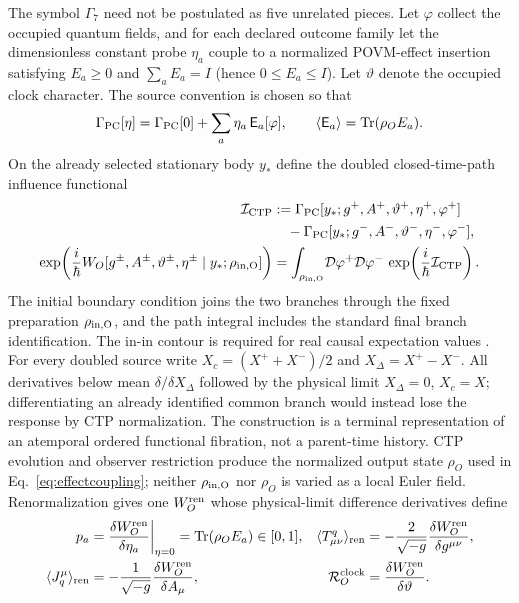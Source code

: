 The symbol $\Gamma_7$ need not be postulated as five unrelated pieces.  Let
$\varphi$ collect the occupied quantum fields, and for each declared outcome
family let the dimensionless constant probe $\eta_a$ couple to a normalized
POVM-effect insertion satisfying
$E_a\geq0$ and $\sum_aE_a=I$ (hence $0\leq E_a\leq I$).  Let $\vartheta$
denote the occupied clock character.  The source convention is chosen so that
\begin{equation}
\Gamma_{\rm PC}[\eta]
=\Gamma_{\rm PC}[0]+\sum_a\eta_a\,\mathsf E_a[\varphi],
\qquad
\langle\mathsf E_a\rangle=\operatorname{Tr}(\rho_OE_a).
\label{eq:effectcoupling}
\end{equation}
On the already selected stationary body $y_*$ define the doubled
closed-time-path influence functional
\begin{align}
\mathcal I_{\rm CTP}
&:=\Gamma_{\rm PC}[y_*;g^+,A^+,\vartheta^+,\eta^+,\varphi^+]\notag\\
&\quad-\Gamma_{\rm PC}[y_*;g^-,A^-,\vartheta^-,\eta^-,\varphi^-],
\label{eq:ctpaction}\\
\exp\!\left(\frac{i}{\hbar}W_O[g^\pm,A^\pm,\vartheta^\pm,\eta^\pm
\mid y_*;\rho_{\rm in,O}]\right)
&=\int_{\rho_{\rm in,O}}\!\mathcal D\varphi^+\mathcal D\varphi^-\,
\exp\!\left(\frac{i}{\hbar}\mathcal I_{\rm CTP}\right).
\label{eq:ineffective}
\end{align}
The initial boundary condition joins the two branches through the fixed
preparation $\rho_{\rm in,O}$, and the path integral includes the standard
final branch identification.  The in-in contour is required for real causal expectation
values \citep{Schwinger1961,Keldysh1965}.  For every doubled source write
$X_c=(X^++X^-)/2$ and $X_\Delta=X^+-X^-$.  All derivatives below mean
$\delta/\delta X_\Delta$ followed by the physical limit
$X_\Delta=0$, $X_c=X$; differentiating an already identified common branch
would instead lose the response by CTP normalization.  The construction is a
terminal representation of an atemporal ordered functional fibration, not a
parent-time history.  CTP evolution and observer restriction produce the
normalized output state $\rho_O$ used in Eq.~\eqref{eq:effectcoupling}; neither
$\rho_{\rm in,O}$ nor $\rho_O$ is varied as a local Euler field.
Renormalization gives one $W_O^{\rm ren}$ whose physical-limit difference
derivatives define
\begin{align}
p_a&=\frac{\delta W_O^{\rm ren}}{\delta\eta_a}\bigg|_{\eta=0}
=\operatorname{Tr}(\rho_OE_a)\in[0,1],
&\langle T^q_{\mu\nu}\rangle_{\rm ren}
&=-\frac{2}{\sqrt{-g}}\frac{\delta W_O^{\rm ren}}{\delta g^{\mu\nu}},
\label{eq:sourceowners1}\\
\langle J_q^\mu\rangle_{\rm ren}
&=-\frac{1}{\sqrt{-g}}\frac{\delta W_O^{\rm ren}}{\delta A_\mu},
&\mathcal R_O^{\rm clock}&=\frac{\delta W_O^{\rm ren}}{\delta\vartheta}.
\label{eq:sourceowners2}
\end{align}
